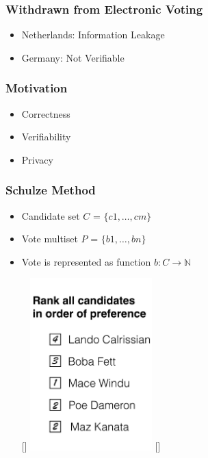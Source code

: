 \documentclass{beamer}
\begin{document}
\begin{frame}
\frametitle{Withdrawn from Electronic Voting}
\begin{itemize}
\item Netherlands: Information Leakage
\item Germany: Not Verifiable
\end{itemize}
\end{frame}


\begin{frame}
\frametitle{Motivation}
\begin{itemize}
\item Correctness
\item Verifiability
\item Privacy
\end{itemize}
\end{frame}






\begin{frame}
\frametitle{Schulze Method}

\begin{itemize}
\item Candidate set $C$ = $\{c1,\dots,cm\}$
 \item Vote multiset  $P$ = $\{b1,\dots,bn\}$
 \item Vote is represented as function $b: C \rightarrow \mathbb{N}$

   \begin{center}
   
  
    \raisebox{0pt}[\dimexpr{}\baselineskip\relax]
    {\includegraphics[width=0.37\textwidth]{bal-cropped.pdf}}
    \raisebox{0pt}[\dimexpr{}\baselineskip\relax]{}
     \end{center}
 \end{itemize}
 \end{frame}
\end{document}
